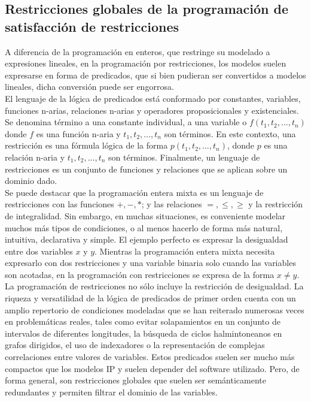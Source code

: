 \documentclass[12pt]{report}
\begin{document}
\subsection{Restricciones globales de la programación de satisfacción de restricciones}

A diferencia de la programación en enteros, que restringe su modelado a expresiones lineales, en la programación por restricciones, los modelos suelen expresarse en forma de predicados, que si bien pudieran ser convertidos a modelos lineales, dicha conversión puede ser engorrosa. \\

El lenguaje de la lógica de predicados está conformado por constantes, variables, funciones n-arias, relaciones n-arias y operadores proposicionales y existenciales. Se denomina término a una constante individual, a una variable o $f(t_1,t_2,...,t_n)$ donde $f$ es una función n-aria y $t_1,t_2,...,t_n$ son términos. En este contexto, una restricción es una fórmula lógica de la forma $p(t_1,t_2,...,t_n)$, donde $p$ es una relación n-aria y $t_1,t_2,...,t_n$ son términos. Finalmente, un lenguaje de restricciones es un conjunto de funciones y relaciones que se aplican sobre un dominio dado. \\

Se puede destacar que la programación entera mixta es un lenguaje de restricciones con las funciones $+, -, *$; y las relaciones $=,\leq,\geq$ y la restricción de integralidad. Sin embargo, en muchas situaciones, es conveniente modelar muchos más tipos de condiciones, o al menos hacerlo de forma más natural, intuitiva, declarativa y simple. El ejemplo perfecto es expresar la desigualdad entre dos variables $x$ y $y$. Mientras la programación entera mixta necesita expresarlo con dos restricciones y una variable binaria solo cuando las variables son acotadas, en la programación con restricciones se expresa de la forma $x\neq y$.\\

La programación de restricciones no sólo incluye la restricción de desigualdad. La riqueza y versatilidad de la lógica de predicados de primer orden cuenta con un amplio repertorio de condiciones modeladas que se han reiterado numerosas veces en problemáticas reales, tales como evitar solapamientos en un conjunto de intervalos de diferentes longitudes, la búsqueda de ciclos halmintoneanos en grafos dirigidos, el uso de indexadores o la representación de complejas correlaciones entre valores de variables. Estos predicados suelen ser mucho más compactos que los modelos IP y suelen depender del software utilizado. Pero, de forma general, son restricciones globales que suelen ser semánticamente redundantes y permiten filtrar el dominio de las variables. \\
\end{document}
